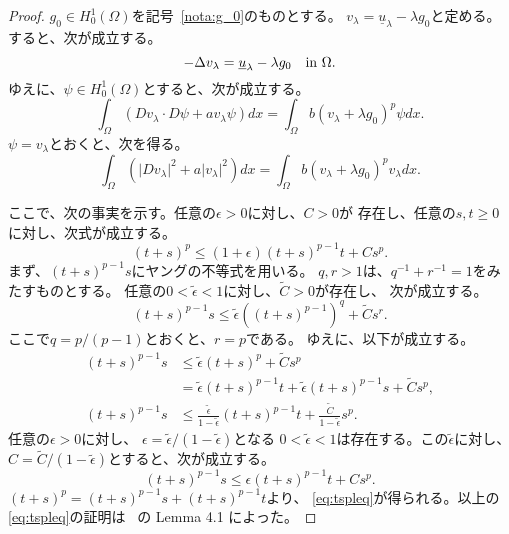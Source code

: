 \begin{proof}
 $g_0 \in H_0^1(\Omega)$を記号~\ref{nota:g_0}のものとする。
 $v_\lambda = \underline{u}_\lambda - \lambda g_0$と定める。
 すると、次が成立する。
 \[
  -\Delta v_\lambda = \underline{u}_\lambda - \lambda g_0 \ \ ~\text{in}~ \Omega.
 \]
 ゆえに、$\psi \in H_0^1(\Omega)$とすると、次が成立する。
 \[
  \int_\Omega (Dv_\lambda \cdot D\psi + a v_\lambda \psi) dx =
 \int_\Omega b(v_\lambda + \lambda g_0)^p \psi dx.
 \]
 $\psi = v_\lambda$とおくと、次を得る。
 \begin{equation}
  \int_\Omega \left( \lvert Dv_\lambda \rvert^2 + a \lvert v_\lambda
               \rvert^2 \right) dx =
  \int_\Omega b(v_\lambda + \lambda g_0)^p v_\lambda dx. \label{eq:v_lambda}
 \end{equation}

 ここで、次の事実を示す。任意の$\epsilon > 0$に対し、$C > 0$が
 存在し、任意の$s, t \geq 0$に対し、次式が成立する。
 \begin{equation}
  (t+s)^p \leq (1 + \epsilon) (t+s)^{p-1} t + C s^p. \label{eq:tspleq}
 \end{equation}
 まず、$(t+s)^{p-1}s$にヤングの不等式を用いる。
 $q, r > 1$は、$q^{-1} + r^{-1} = 1$をみたすものとする。
 任意の$0 < \tilde{\epsilon} < 1$に対し、$\tilde{C} > 0$が存在し、
 次が成立する。
 \[
  (t+s)^{p-1} s \leq \tilde{\epsilon} \left( (t+s)^{p-1} \right)^q +
 \tilde{C} s^r.
 \]
 ここで$q = p/(p-1)$とおくと、$r = p$である。
 ゆえに、以下が成立する。
 \begin{align*}
  (t+s)^{p-1} s & \leq \tilde{\epsilon} (t+s)^p + \tilde{C} s^p \\
  &= \tilde{\epsilon} (t+s)^{p-1} t + \tilde{\epsilon} (t+s)^{p-1} s 
  + \tilde{C} s^p, \\
  (t+s)^{p-1} s &\leq \frac{\tilde{\epsilon}}{1 - \tilde{\epsilon}}
  (t+s)^{p-1} t + \frac{\tilde{C}}{1 - \tilde{\epsilon}} s^p.
 \end{align*}
 任意の$\epsilon > 0$に対し、
 $\epsilon = \tilde{\epsilon} / (1 - \tilde{\epsilon})$となる
 $0 < \tilde{\epsilon} < 1$は存在する。この$\tilde{\epsilon}$に対し、
 $C = \tilde{C}/ (1 - \tilde{\epsilon})$とすると、次が成立する。
 \[
  (t+s)^{p-1} s \leq \epsilon (t+s)^{p-1} t + Cs^p.
 \]
 $(t+s)^{p} = (t+s)^{p-1} s + (t+s)^{p-1}t$より、
 \eqref{eq:tspleq}が得られる。以上の\eqref{eq:tspleq}の証明は
 \cite{MR2317491}~の Lemma 4.1 によった。


\end{proof}
